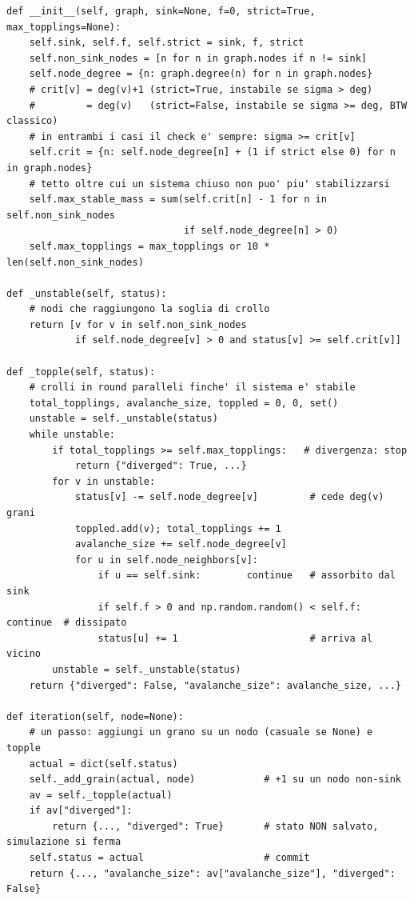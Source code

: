 \documentclass[10pt,a4paper]{article}
\begin{document}
\begin{lstlisting}
def __init__(self, graph, sink=None, f=0, strict=True, max_topplings=None):
    self.sink, self.f, self.strict = sink, f, strict
    self.non_sink_nodes = [n for n in graph.nodes if n != sink]
    self.node_degree = {n: graph.degree(n) for n in graph.nodes}
    # crit[v] = deg(v)+1 (strict=True, instabile se sigma > deg)
    #         = deg(v)   (strict=False, instabile se sigma >= deg, BTW classico)
    # in entrambi i casi il check e' sempre: sigma >= crit[v]
    self.crit = {n: self.node_degree[n] + (1 if strict else 0) for n in graph.nodes}
    # tetto oltre cui un sistema chiuso non puo' piu' stabilizzarsi
    self.max_stable_mass = sum(self.crit[n] - 1 for n in self.non_sink_nodes
                               if self.node_degree[n] > 0)
    self.max_topplings = max_topplings or 10 * len(self.non_sink_nodes)

def _unstable(self, status):
    # nodi che raggiungono la soglia di crollo
    return [v for v in self.non_sink_nodes
            if self.node_degree[v] > 0 and status[v] >= self.crit[v]]

def _topple(self, status):
    # crolli in round paralleli finche' il sistema e' stabile
    total_topplings, avalanche_size, toppled = 0, 0, set()
    unstable = self._unstable(status)
    while unstable:
        if total_topplings >= self.max_topplings:   # divergenza: stop
            return {"diverged": True, ...}
        for v in unstable:
            status[v] -= self.node_degree[v]         # cede deg(v) grani
            toppled.add(v); total_topplings += 1
            avalanche_size += self.node_degree[v]
            for u in self.node_neighbors[v]:
                if u == self.sink:        continue   # assorbito dal sink
                if self.f > 0 and np.random.random() < self.f: continue  # dissipato
                status[u] += 1                       # arriva al vicino
        unstable = self._unstable(status)
    return {"diverged": False, "avalanche_size": avalanche_size, ...}

def iteration(self, node=None):
    # un passo: aggiungi un grano su un nodo (casuale se None) e topple
    actual = dict(self.status)
    self._add_grain(actual, node)            # +1 su un nodo non-sink
    av = self._topple(actual)
    if av["diverged"]:
        return {..., "diverged": True}       # stato NON salvato, simulazione si ferma
    self.status = actual                     # commit
    return {..., "avalanche_size": av["avalanche_size"], "diverged": False}
\end{lstlisting}
\end{document}
